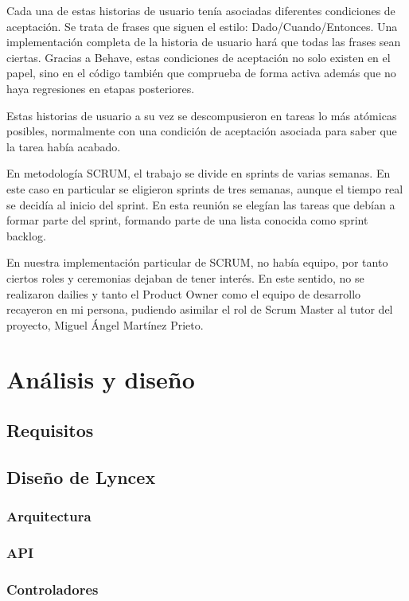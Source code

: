 \documentclass[12pt]{report} %
\begin{document}
Cada una de estas historias de usuario tenía asociadas diferentes condiciones de aceptación. Se trata de frases que siguen el estilo: Dado/Cuando/Entonces. 
Una implementación completa de la historia de usuario hará que todas las frases sean ciertas. Gracias a Behave, estas condiciones de aceptación no solo existen en el papel, sino en el código también que comprueba de forma activa además que no haya regresiones en etapas posteriores.

Estas historias de usuario a su vez se descompusieron en tareas lo más atómicas posibles, normalmente con una condición de aceptación asociada para saber que la tarea había acabado.

En metodología SCRUM, el trabajo se divide en sprints de varias semanas. En este caso en particular se eligieron sprints de tres semanas, aunque el tiempo real se decidía al inicio del sprint.
En esta reunión se elegían las tareas que debían a formar parte del sprint, formando parte de una lista conocida como sprint backlog.

En nuestra implementación particular de SCRUM, no había equipo, por tanto ciertos roles y ceremonias dejaban de tener interés. 
En este sentido, no se realizaron dailies y tanto el Product Owner como el equipo de desarrollo recayeron en mi persona, pudiendo asimilar el rol de Scrum Master al tutor del proyecto, Miguel Ángel Martínez Prieto.

\chapter{Análisis y diseño}

\section{Requisitos}

\section{Diseño de Lyncex}

\subsection{Arquitectura}

\subsection{API}

\subsection{Controladores}
\end{document}
